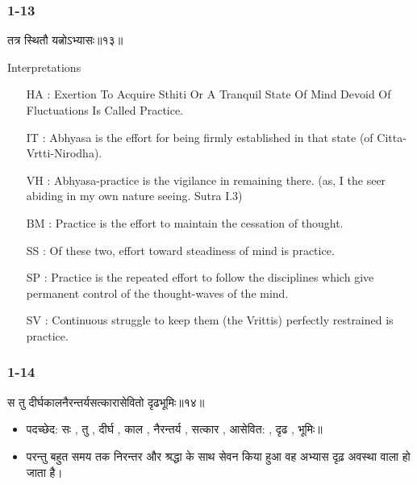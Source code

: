 \begin{frame}[fragile]\frametitle{1-13}
\begin{sanskrit}
तत्र स्थितौ यत्नोऽभ्यासः॥१३॥
\end{sanskrit}

Interpretations
\begin{itemize}	
\item [HA]: Exertion To Acquire Sthiti Or A Tranquil State Of Mind Devoid Of Fluctuations Is Called Practice.
\item [IT]: Abhyasa is the effort for being firmly established in that state (of Citta-Vrtti-Nirodha).
\item [VH]: Abhyasa-practice is the vigilance in remaining there. (as, I the seer abiding in my own nature seeing. Sutra I.3)
\item [BM]: Practice is the effort to maintain the cessation of thought.
\item [SS]: Of these two, effort toward steadiness of mind is practice.
\item [SP]: Practice is the repeated effort to follow the disciplines which give permanent control of the thought-waves of the mind.
\item [SV]: Continuous struggle to keep them (the Vrittis) perfectly restrained is practice. 
\end{itemize}
	
\end{frame}

\begin{frame}[fragile]\frametitle{1-14}
\begin{sanskrit}
स तु दीर्घकालनैरन्तर्यसत्कारासेवितो दृढभूमिः॥१४॥
\end{sanskrit}

\begin{itemize}
\item पदच्छेद: सः , तु , दीर्घ , काल , नैरन्तर्य , सत्कार , आसेवित: , दृढ , भूमिः॥
\item परन्तु बहुत समय तक निरन्तर और श्रद्धा के साथ सेवन किया हुआ वह अभ्यास दृढ़ अवस्था वाला हो जाता है।
\end{itemize}
	
\end{frame}

